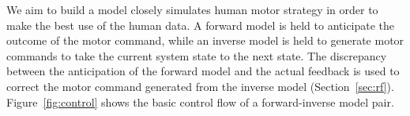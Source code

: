 

We aim to build a model closely simulates human motor strategy in order to make the best use of the human data. A forward model is held to anticipate the outcome of the motor command, while an inverse model is held to generate motor commands to take the current system state to the next state. The discrepancy between the anticipation of the forward model and the actual feedback is used to correct the motor command generated from the inverse model (Section~\ref{sec:rf}). Figure~\ref{fig:control} shows the basic control flow of a forward-inverse model pair.

